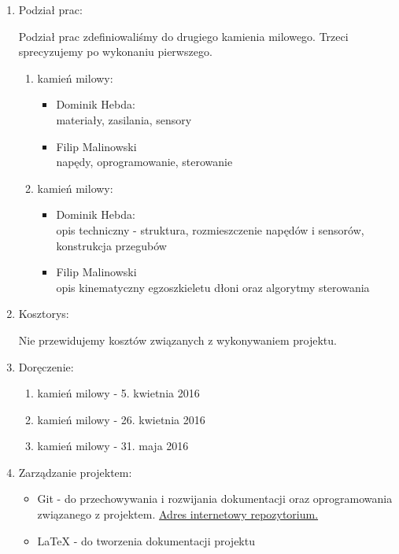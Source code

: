 \documentclass[a4paper]{article}
\begin{document}
\begin{enumerate}
\newpage

\item Podział prac:

Podział prac zdefiniowaliśmy do drugiego kamienia milowego. Trzeci sprecyzujemy po wykonaniu pierwszego.
\begin{enumerate}[I]
\item kamień milowy:
\begin{itemize}
\item Dominik Hebda: \\
materiały, zasilania, sensory
\item Filip Malinowski \\
napędy, oprogramowanie, sterowanie
\end{itemize}
\item kamień milowy:
\begin{itemize}
\item Dominik Hebda: \\
opis techniczny - struktura, rozmieszczenie napędów i sensorów, konstrukcja przegubów
\item Filip Malinowski \\
opis kinematyczny egzoszkieletu dłoni oraz algorytmy sterowania
\end{itemize}
\end{enumerate}

\item Kosztorys:

Nie przewidujemy kosztów związanych z wykonywaniem projektu.

\item Doręczenie:
\begin{enumerate}[I]
\item kamień milowy - 5. kwietnia 2016
\item kamień milowy - 26. kwietnia 2016
\item kamień milowy - 31. maja 2016
\end{enumerate}

\item Zarządzanie projektem:
\begin{itemize}
\item Git - do przechowywania i rozwijania dokumentacji oraz oprogramowania związanego z projektem.
\href{https://github.com/hizonglol/roboty_mobilne-2016}{Adres internetowy repozytorium.}
\item LaTeX - do tworzenia dokumentacji projektu
\end{itemize}
\end{enumerate}
\end{document}
